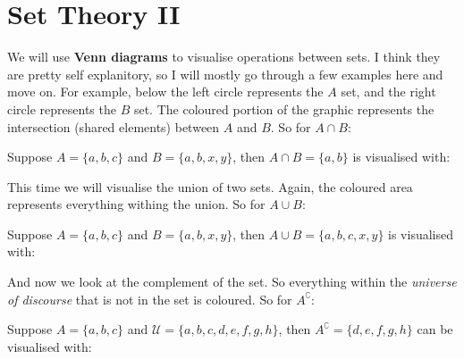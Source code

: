 \chapter{Set Theory II}

We will use {\bf Venn diagrams} to visualise operations between sets. I think they are pretty self explanitory, so I will mostly go through a few examples here and move on. For example, below the left circle represents the $A$ set, and the right circle represents the $B$ set. The coloured portion of the graphic represents the intersection (shared elements) between $A$ and $B$. So for $A \cap B$:

\begin{venndiagram2sets}[shade=skyblue,showframe=false]
	\fillACapB
\end{venndiagram2sets}

\myexample
{
	Suppose $A=\{a,b,c\}$ and $B=\{a,b,x,y\}$, then $A \cap B=\{a,b\}$ is visualised with:\\
	\begin{venndiagram2sets}[shade=skyblue,showframe=false,labelOnlyA={c},labelOnlyB={x,y},labelAB={a,b}]
		\fillACapB
	\end{venndiagram2sets}
}

This time we will visualise the union of two sets. Again, the coloured area represents everything withing the union. So for $A \cup B$:

\begin{venndiagram2sets}[shade=skyblue,showframe=false]
	\fillA \fillB
\end{venndiagram2sets}

\myexample
{
	Suppose $A=\{a,b,c\}$ and $B=\{a,b,x,y\}$, then $A \cup B=\{a,b,c,x,y\}$  is visualised with:\\
	\begin{venndiagram2sets}[shade=skyblue,showframe=false,labelOnlyA={c},labelOnlyB={x,y},labelAB={a,b}]
		\fillA \fillB
	\end{venndiagram2sets}
}

And now we look at the complement of the set. So everything within the \emph{universe of discourse} that is not in the set is coloured. So for $A^\complement$:

\begin{venndiagram2sets}[shade=skyblue,overlap=2.4cm,hgap=2.2cm,vgap=0.5cm,labelNotAB={\;\quad\qquad $\mathcal{U}$},labelB={}]
	\fillNotA
\end{venndiagram2sets}

\myexample
{
	Suppose $A=\{a,b,c\}$ and $\mathcal{U}=\{a,b,c,d,e,f,g,h\}$, then $A^\complement=\{d,e,f,g,h\}$ can be visualised with:\\
	\begin{venndiagram2sets}[shade=skyblue,overlap=2.4cm,hgap=2.2cm,vgap=0.5cm,labelNotAB={\;\quad\qquad $\mathcal{U}$ \: $d,e,f,g,h$},labelOnlyA={$a,b,c$},labelB={}]
		\fillNotA
	\end{venndiagram2sets}
}

